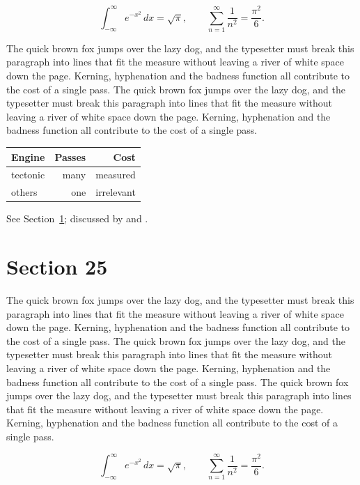 \documentclass{article}
\begin{document}
\begin{equation}\label{eq:24}
\int_{-\infty}^{\infty} e^{-x^{2}}\,dx = \sqrt{\pi}, \qquad
\sum_{n=1}^{\infty} \frac{1}{n^{2}} = \frac{\pi^{2}}{6}.
\end{equation}

The quick brown fox jumps over the lazy dog, and the typesetter must break this paragraph into lines that fit the measure without leaving a river of white space down the page. Kerning, hyphenation and the badness function all contribute to the cost of a single pass. The quick brown fox jumps over the lazy dog, and the typesetter must break this paragraph into lines that fit the measure without leaving a river of white space down the page. Kerning, hyphenation and the badness function all contribute to the cost of a single pass. 

\begin{center}
\begin{tabular}{lrr}
\toprule
Engine & Passes & Cost \\
\midrule
tectonic & many & measured \\
others & one & irrelevant \\
\bottomrule
\end{tabular}
\end{center}

See Section~\ref{sec:25}; discussed by \textcite{k5} and \textcite{l2}.
\section{Section 25}
\label{sec:25}
The quick brown fox jumps over the lazy dog, and the typesetter must break this paragraph into lines that fit the measure without leaving a river of white space down the page. Kerning, hyphenation and the badness function all contribute to the cost of a single pass. The quick brown fox jumps over the lazy dog, and the typesetter must break this paragraph into lines that fit the measure without leaving a river of white space down the page. Kerning, hyphenation and the badness function all contribute to the cost of a single pass. The quick brown fox jumps over the lazy dog, and the typesetter must break this paragraph into lines that fit the measure without leaving a river of white space down the page. Kerning, hyphenation and the badness function all contribute to the cost of a single pass. 

\begin{equation}\label{eq:25}
\int_{-\infty}^{\infty} e^{-x^{2}}\,dx = \sqrt{\pi}, \qquad
\sum_{n=1}^{\infty} \frac{1}{n^{2}} = \frac{\pi^{2}}{6}.
\end{equation}
\end{document}

